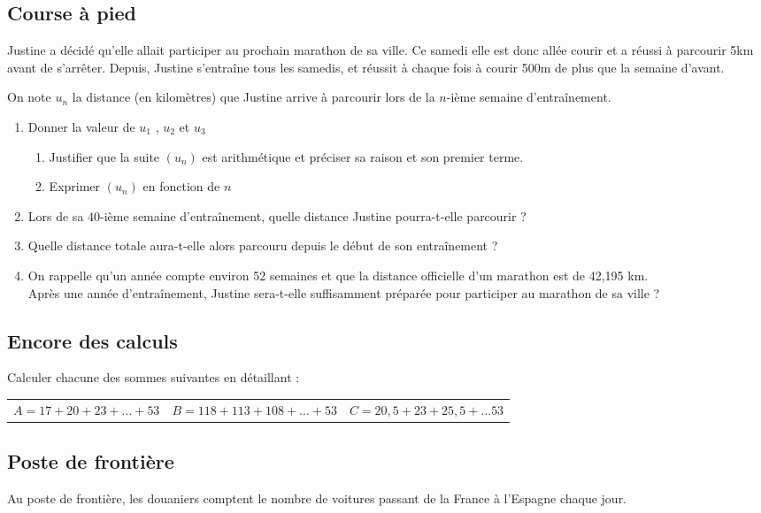 \documentclass[oneside,12pt]{article}          %
\begin{document}
\subsection{Course à pied}
Justine a décidé qu'elle allait participer au prochain marathon de sa ville. Ce samedi elle est donc allée courir et a réussi à parcourir 5km avant de s'arrêter. Depuis, Justine s'entraîne tous les samedis, et réussit à chaque fois à courir 500m de plus que la semaine d'avant.

On note $u_n$ la distance (en kilomètres) que Justine arrive à parcourir lors de la $n$-ième semaine d'entraînement.
\begin{enumerate}
	\item Donner la valeur de $u_1$ , $u_2$ et $u_3$
	\begin{enumerate}
		\item Justifier que la suite $(u_n)$ est arithmétique et préciser sa raison et son premier terme.
		\item Exprimer $(u_n)$ en fonction de $n$
	\end{enumerate}
	\item Lors de sa $40$-ième semaine d'entraînement, quelle distance Justine pourra-t-elle parcourir ?
	\item Quelle distance totale aura-t-elle alors parcouru depuis le début de son entraînement ?
	\item On rappelle qu'un année compte environ 52 semaines et que la distance officielle d'un marathon est de 42,195 km. \\
	Après une année d'entraînement, Justine sera-t-elle suffisamment préparée pour participer au marathon de sa ville ?
\end{enumerate}



\subsection{Encore des calculs}
Calculer chacune des sommes suivantes en détaillant :  \\
\begin{tabular}{p{} p{} p{}}
     $A = 17 + 20 + 23 +\ldots + 53$ & $B = 118 + 113 + 108 + \ldots + 53$ & $C = 20,5 + 23 + 25,5 + \ldots 53$
\end{tabular}



\subsection{Poste de frontière}
Au poste de frontière, les douaniers comptent le nombre de voitures passant de la France à l'Espagne chaque jour.
\end{document}
